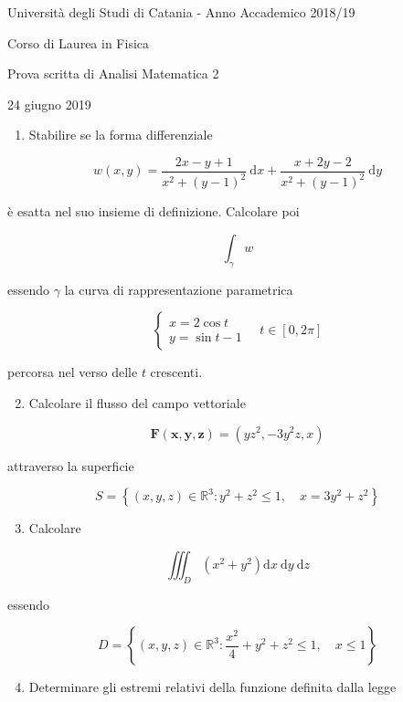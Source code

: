 \documentclass[10pt]{article}
\begin{document}
Università degli Studi di Catania - Anno Accademico 2018/19

Corso di Laurea in Fisica

Prova scritta di Analisi Matematica 2

24 giugno 2019

\begin{enumerate}
  \item Stabilire se la forma differenziale
\end{enumerate}

\[
w(x, y)=\frac{2 x-y+1}{x^{2}+(y-1)^{2}} \mathrm{~d} x+\frac{x+2 y-2}{x^{2}+(y-1)^{2}} \mathrm{~d} y
\]

è esatta nel suo insieme di definizione. Calcolare poi

\[
\int_{\gamma} w
\]

essendo \(\gamma\) la curva di rappresentazione parametrica

\[
\left\{\begin{array}{l}
x=2 \cos t \\
y=\sin t-1
\end{array} \quad t \in[0,2 \pi]\right.
\]

percorsa nel verso delle \(t\) crescenti.

\begin{enumerate}
  \setcounter{enumi}{1}
  \item Calcolare il flusso del campo vettoriale
\end{enumerate}

\[
\mathbf{F}(\mathbf{x}, \mathbf{y}, \mathbf{z})=\left(y z^{2},-3 y^{2} z, x\right)
\]

attraverso la superficie

\[
S=\left\{(x, y, z) \in \mathbb{R}^{3}: y^{2}+z^{2} \leq 1, \quad x=3 y^{2}+z^{2}\right\}
\]

\begin{enumerate}
  \setcounter{enumi}{2}
  \item Calcolare
\end{enumerate}

\[
\iiint_{D}\left(x^{2}+y^{2}\right) \mathrm{d} x \mathrm{~d} y \mathrm{~d} z
\]

essendo

\[
D=\left\{(x, y, z) \in \mathbb{R}^{3}: \frac{x^{2}}{4}+y^{2}+z^{2} \leq 1, \quad x \leq 1\right\}
\]

\begin{enumerate}
  \setcounter{enumi}{3}
  \item Determinare gli estremi relativi della funzione definita dalla legge
\end{enumerate}
\end{document}
